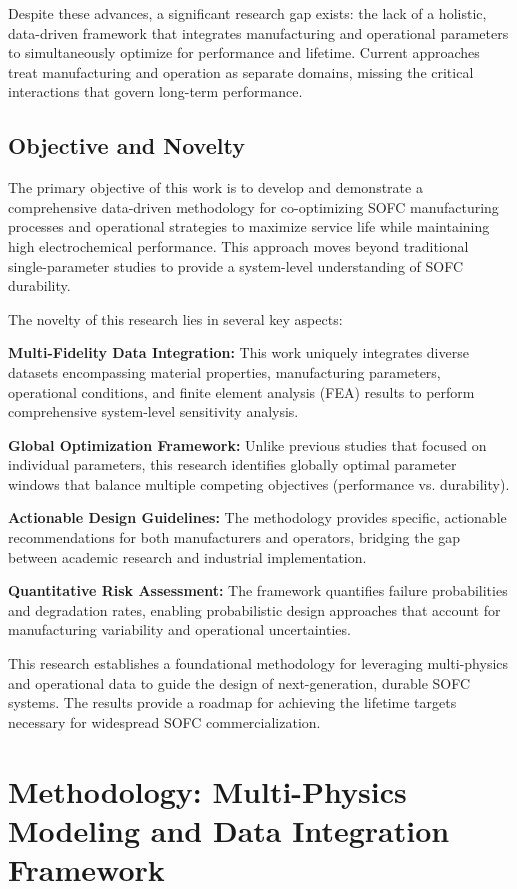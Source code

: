\documentclass[conference]{IEEEtran}
\begin{document}
Despite these advances, a significant research gap exists: the lack of a holistic, data-driven framework that integrates manufacturing and operational parameters to simultaneously optimize for performance and lifetime. Current approaches treat manufacturing and operation as separate domains, missing the critical interactions that govern long-term performance.

\subsection{Objective and Novelty}

The primary objective of this work is to develop and demonstrate a comprehensive data-driven methodology for co-optimizing SOFC manufacturing processes and operational strategies to maximize service life while maintaining high electrochemical performance. This approach moves beyond traditional single-parameter studies to provide a system-level understanding of SOFC durability.

The novelty of this research lies in several key aspects:

\textbf{Multi-Fidelity Data Integration:} This work uniquely integrates diverse datasets encompassing material properties, manufacturing parameters, operational conditions, and finite element analysis (FEA) results to perform comprehensive system-level sensitivity analysis.

\textbf{Global Optimization Framework:} Unlike previous studies that focused on individual parameters, this research identifies globally optimal parameter windows that balance multiple competing objectives (performance vs. durability).

\textbf{Actionable Design Guidelines:} The methodology provides specific, actionable recommendations for both manufacturers and operators, bridging the gap between academic research and industrial implementation.

\textbf{Quantitative Risk Assessment:} The framework quantifies failure probabilities and degradation rates, enabling probabilistic design approaches that account for manufacturing variability and operational uncertainties.

This research establishes a foundational methodology for leveraging multi-physics and operational data to guide the design of next-generation, durable SOFC systems. The results provide a roadmap for achieving the lifetime targets necessary for widespread SOFC commercialization.

\section{Methodology: Multi-Physics Modeling and Data Integration Framework}
\end{document}
